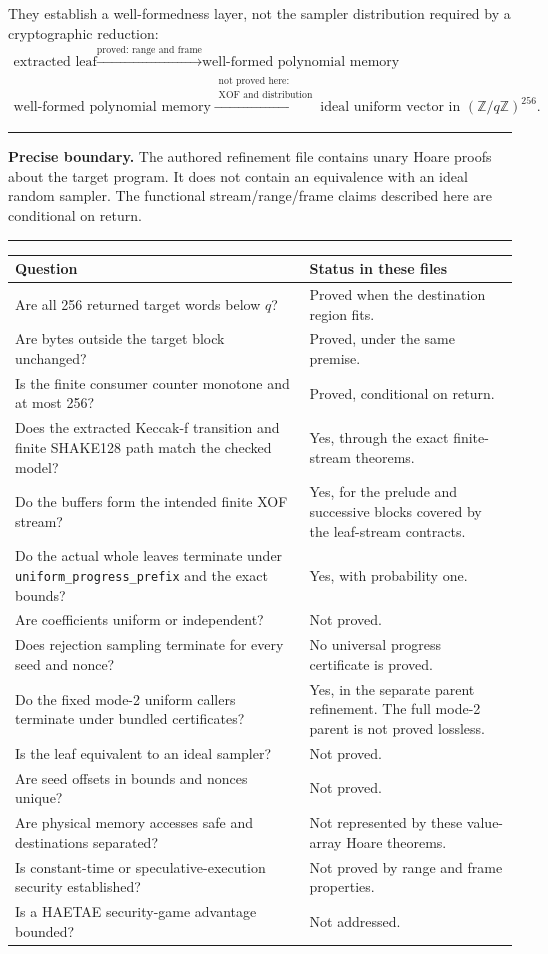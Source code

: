 \documentclass[11pt]{article}
\theoremstyle{definition}
\theoremstyle{plain}
\theoremstyle{remark}
\newcommand{\code}[1]{\nolinkurl{#1}}
\newcommand{\Z}{\mathbb Z}
\newenvironment{boundarybox}
  {\begin{center}\begin{minipage}{0.94\linewidth}\color{artifactred}\hrule\vspace{0.6em}\color{black}}
  {\vspace{0.6em}\color{artifactred}\hrule\end{minipage}\end{center}}
\begin{document}
They establish a well-formedness layer, not the sampler distribution required
by a cryptographic reduction:
\[
\begin{array}{c}
\text{extracted leaf}
\xrightarrow{\text{proved: range and frame}}
\text{well-formed polynomial memory}
\\[0.6em]
\text{well-formed polynomial memory}
\xrightarrow{\substack{\text{not proved here:}\\[-0.2em]
                        \text{XOF and distribution}}}
\text{ideal uniform vector in }(\Z/q\Z)^{256}.
\end{array}
\]

\begin{boundarybox}
\textbf{Precise boundary.}
The authored refinement file contains unary Hoare proofs about the target
program.  It does not contain an equivalence with an ideal random sampler.
The functional stream/range/frame claims described here are conditional on
return.
\end{boundarybox}

\noindent\begin{tabularx}{\textwidth}{>{\raggedright\arraybackslash}p{}X}
\toprule
Question & Status in these files \\
\midrule
Are all 256 returned target words below $q$? & Proved when the destination region fits. \\
Are bytes outside the target block unchanged? & Proved, under the same premise. \\
Is the finite consumer counter monotone and at most 256? & Proved, conditional on return. \\
Does the extracted Keccak-f transition and finite SHAKE128 path match the checked model? & Yes, through the exact finite-stream theorems. \\
Do the buffers form the intended finite XOF stream? & Yes, for the prelude and successive blocks covered by the leaf-stream contracts. \\
Do the actual whole leaves terminate under \code{uniform_progress_prefix} and the exact bounds? & Yes, with probability one. \\
Are coefficients uniform or independent? & Not proved. \\
Does rejection sampling terminate for every seed and nonce? & No universal progress certificate is proved. \\
Do the fixed mode-2 uniform callers terminate under bundled certificates? &
Yes, in the separate parent refinement.  The full mode-2 parent is not proved
lossless. \\
Is the leaf equivalent to an ideal sampler? & Not proved. \\
Are seed offsets in bounds and nonces unique? & Not proved. \\
Are physical memory accesses safe and destinations separated? & Not represented by these value-array Hoare theorems. \\
Is constant-time or speculative-execution security established? & Not proved by range and frame properties. \\
Is a HAETAE security-game advantage bounded? & Not addressed. \\
\bottomrule
\end{tabularx}
\end{document}
